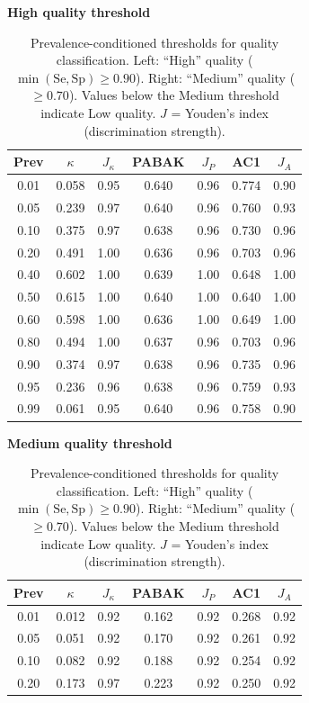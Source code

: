 
\begin{table}[h!]
\centering
\caption{Prevalence-conditioned thresholds for quality classification. Left: ``High'' quality ($\min(\text{Se}, \text{Sp}) \geq 0.90$). Right: ``Medium'' quality ($\geq 0.70$). Values below the Medium threshold indicate Low quality. $J$ = Youden's index (discrimination strength).}
\label{tab:thresholds}

\begin{minipage}[t]{0.48\textwidth}
\centering
\textbf{High quality threshold}
\small
\begin{tabular}{ccccccc}
\toprule
Prev & $\kappa$ & $J_\kappa$ & PABAK & $J_P$ & AC1 & $J_A$ \\
\midrule
0.01 & 0.058 & 0.95 & 0.640 & 0.96 & 0.774 & 0.90 \\
0.05 & 0.239 & 0.97 & 0.640 & 0.96 & 0.760 & 0.93 \\
0.10 & 0.375 & 0.97 & 0.638 & 0.96 & 0.730 & 0.96 \\
0.20 & 0.491 & 1.00 & 0.636 & 0.96 & 0.703 & 0.96 \\
0.40 & 0.602 & 1.00 & 0.639 & 1.00 & 0.648 & 1.00 \\
0.50 & 0.615 & 1.00 & 0.640 & 1.00 & 0.640 & 1.00 \\
0.60 & 0.598 & 1.00 & 0.636 & 1.00 & 0.649 & 1.00 \\
0.80 & 0.494 & 1.00 & 0.637 & 0.96 & 0.703 & 0.96 \\
0.90 & 0.374 & 0.97 & 0.638 & 0.96 & 0.735 & 0.96 \\
0.95 & 0.236 & 0.96 & 0.638 & 0.96 & 0.759 & 0.93 \\
0.99 & 0.061 & 0.95 & 0.640 & 0.96 & 0.758 & 0.90 \\
\bottomrule
\end{tabular}
\end{minipage}%
\hfill
\begin{minipage}[t]{0.48\textwidth}
\centering
\textbf{Medium quality threshold}
\small
\begin{tabular}{ccccccc}
\toprule
Prev & $\kappa$ & $J_\kappa$ & PABAK & $J_P$ & AC1 & $J_A$ \\
\midrule
0.01 & 0.012 & 0.92 & 0.162 & 0.92 & 0.268 & 0.92 \\
0.05 & 0.051 & 0.92 & 0.170 & 0.92 & 0.261 & 0.92 \\
0.10 & 0.082 & 0.92 & 0.188 & 0.92 & 0.254 & 0.92 \\
0.20 & 0.173 & 0.97 & 0.223 & 0.92 & 0.250 & 0.92 \\

\end{tabular}
\end{minipage}
\end{table}
